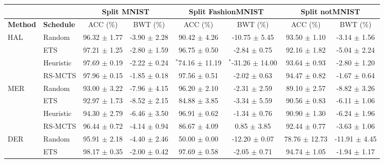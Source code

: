 
\begin{tabular}{llcccccc}
	\toprule
	\textbf{}              & \textbf{}         & \multicolumn{2}{c}{\textbf{Split MNIST}} & \multicolumn{2}{c}{\textbf{Split FashionMNIST}} & \multicolumn{2}{c}{\textbf{Split notMNIST}} \\ \midrule
	\textbf{Method}        & \textbf{Schedule} & ACC (\%)           & BWT (\%)            & ACC (\%)               & BWT (\%)               & ACC (\%)             & BWT (\%)             \\ \midrule
	\multirow{4}{*}{HAL}   & Random            & 96.32 $\pm$ 1.77     & -3.90 $\pm$ 2.28      & 90.42 $\pm$ 4.26         & -10.75 $\pm$ 5.45        & 93.50 $\pm$ 1.10       & -3.14 $\pm$ 1.56       \\
	& ETS               & 97.21 $\pm$ 1.25     & -2.80 $\pm$ 1.59      & 96.75 $\pm$ 0.50         & -2.84 $\pm$ 0.75         & 92.16 $\pm$ 1.82       & -5.04 $\pm$ 2.24       \\
	& Heuristic           & 97.69 $\pm$ 0.19     & -2.22 $\pm$ 0.24      & $^{*}$74.16 $\pm$ 11.19        & $^{*}$-31.26 $\pm$ 14.00       & 93.64 $\pm$ 0.93       & -2.80 $\pm$ 1.20       \\
	& RS-MCTS              & 97.96 $\pm$ 0.15     & -1.85 $\pm$ 0.18      & 97.56 $\pm$ 0.51         & -2.02 $\pm$ 0.63         & 94.47 $\pm$ 0.82       & -1.67 $\pm$ 0.64       \\ \midrule
	\multirow{4}{*}{MER}   & Random            & 93.00 $\pm$ 3.22     & -7.96 $\pm$ 4.15      & 96.20 $\pm$ 2.10         & -2.31 $\pm$ 2.59         & 89.10 $\pm$ 2.57       & -8.82 $\pm$ 3.26       \\
	& ETS               & 92.97 $\pm$ 1.73     & -8.52 $\pm$ 2.15      & 84.88 $\pm$ 3.85         & -3.34 $\pm$ 5.59         & 90.56 $\pm$ 0.83       & -6.11 $\pm$ 1.06       \\
	& Heuristic           & 94.30 $\pm$ 2.79     & -6.46 $\pm$ 3.50      & 96.91 $\pm$ 0.62         & -1.34 $\pm$ 0.76         & 90.90 $\pm$ 1.30       & -6.24 $\pm$ 1.96       \\
	& RS-MCTS              & 96.44 $\pm$ 0.72     & -4.14 $\pm$ 0.94      & 86.67 $\pm$ 4.09         & 0.85 $\pm$ 3.85          & 92.44 $\pm$ 0.77       & -3.63 $\pm$ 1.06       \\ \midrule
	\multirow{4}{*}{DER}   & Random            & 95.91 $\pm$ 2.18     & -4.40 $\pm$ 2.46      & 50.00 $\pm$ 0.00         & -12.20 $\pm$ 0.07        & 78.76 $\pm$ 12.73      & -11.91 $\pm$ 4.45      \\
	& ETS               & 98.17 $\pm$ 0.35     & -2.00 $\pm$ 0.42      & 97.69 $\pm$ 0.58         & -2.05 $\pm$ 0.71         & 94.74 $\pm$ 1.05       & -1.94 $\pm$ 1.17       \\

\end{tabular}
